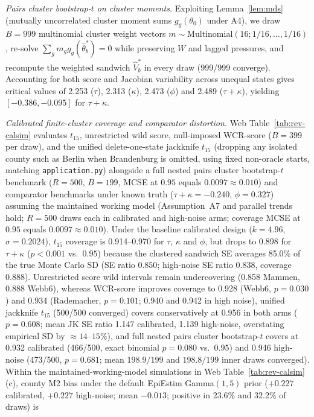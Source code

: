 \emph{Pairs cluster bootstrap-$t$ on cluster moments.} Exploiting Lemma~\ref{lem:mds} (mutually
uncorrelated cluster moment sums $g_g(\theta_0)$ under A4), we draw $B=999$ multinomial cluster
weight vectors $m\sim\mathrm{Multinomial}(16;1/16,\dots,1/16)$, re-solve $\sum_g m_g g_g(\hat\theta^*_b)=0$
while preserving $W$ and lagged pressures, and recompute the weighted sandwich $\hat V^*_b$ in every
draw (999/999 converge). Accounting for both score and Jacobian variability across unequal states
gives critical values of 2.253 ($\tau$), 2.313 ($\kappa$), 2.473 ($\phi$) and 2.489 ($\tau+\kappa$),
yielding $[-0.386,-0.095]$ for $\tau+\kappa$.

\emph{Calibrated finite-cluster coverage and comparator distortion.} Web Table~\ref{tab:rev-calsim}
evaluates $t_{15}$, unrestricted wild score, null-imposed WCR-score ($B=399$ per draw), and the
unified delete-one-state jackknife $t_{15}$ (dropping any isolated county such as Berlin when
Brandenburg is omitted, using fixed non-oracle starts, matching \texttt{application.py}) alongside
a full nested pairs cluster bootstrap-$t$ benchmark ($R=500$, $B=199$, MCSE at $0.95$ equals
$0.0097\approx 0.010$) and comparator benchmarks under known truth ($\tau+\kappa=-0.240$,
$\phi=0.327$) assuming the maintained working model (Assumption~A7 and parallel trends hold; $R=500$
draws each in calibrated and high-noise arms; coverage MCSE at $0.95$ equals $0.0097\approx 0.010$).
Under the baseline calibrated design ($k=4.96$, $\sigma=0.2024$), $t_{15}$ coverage is 0.914--0.970
for $\tau$, $\kappa$ and $\phi$, but drops to 0.898 for $\tau+\kappa$ ($p<0.001$ vs.\ $0.95$)
because the clustered sandwich SE averages 85.0\% of the true Monte Carlo SD (SE ratio $0.850$;
high-noise SE ratio $0.838$, coverage 0.888). Unrestricted score wild intervals remain
undercovering (0.858 Mammen, 0.888 Webb6), whereas WCR-score improves coverage to 0.928 (Webb6,
$p=0.030$) and 0.934 (Rademacher, $p=0.101$; 0.940 and 0.942 in high noise), unified jackknife
$t_{15}$ (500/500 converged) covers conservatively at 0.956 in both arms ($p=0.608$; mean JK SE
ratio 1.147 calibrated, 1.139 high-noise, overstating empirical SD by $\approx 14$--$15\%$), and
full nested pairs cluster bootstrap-$t$ covers at 0.932 calibrated (466/500, exact binomial
$p=0.080$ vs.\ $0.95$) and 0.946 high-noise (473/500, $p=0.681$; mean $198.9/199$ and $198.8/199$
inner draws converged). Within the maintained-working-model simulations in Web
Table~\ref{tab:rev-calsim}(c), county M2 bias under the default EpiEstim Gamma$(1,5)$ prior
($+0.227$ calibrated, $+0.227$ high-noise; mean $-0.013$; positive in 23.6\% and 32.2\% of draws) is

